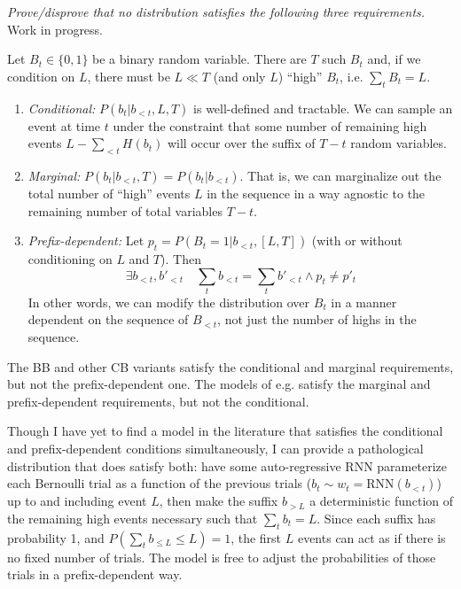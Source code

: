 \documentclass{article}
\begin{document}
\emph{Prove/disprove that no distribution satisfies the following three
requirements.}
Work in progress.

Let $B_t \in \{0,1\}$ be a binary random variable. There are $T$ such $B_t$
and, if we condition on $L$, there must be $L \ll T$ (and only $L$) ``high''
$B_t$, i.e. $\sum_t B_t = L$.
%
\begin{enumerate}
    \item \emph{Conditional:} $P(b_t|b_{<t}, L, T)$ is well-defined and
          tractable. We can sample an event at time $t$ under the constraint
          that some number of remaining high events $L - \sum_{<t} H(b_t)$ will
          occur over the suffix of $T - t$ random variables.
    \item \emph{Marginal:} $P(b_t|b_{<t}, T) = P(b_t|b_{<t})$. That is, we can
          marginalize out the total number of ``high'' events $L$ in the
          sequence in a way agnostic to the remaining number of total variables
          $T - t$.
    \item \emph{Prefix-dependent:} Let $p_t = P(B_t = 1|b_{<t}, [L, T])$
          (with or without conditioning on $L$ and $T$). Then
          \begin{equation*}
            \exists b_{<t}, b'_{<t} \quad
                \sum_t b_{<t} = \sum_t b'_{<t} \land p_t \neq p'_t
          \end{equation*}
          In other words, we can modify the distribution over $B_t$ in a manner
          dependent on the sequence of $B_{<t}$, not just the number of highs
          in the sequence.
\end{enumerate}
%
The BB and other CB variants satisfy the conditional and marginal requirements,
but not the prefix-dependent one. The models of e.g.
\citet{luoLearningOnlineAlignments2017,raffelOnlineLineartimeAttention2017}
satisfy the marginal and prefix-dependent requirements, but not the
conditional.

Though I have yet to find a model in the literature that satisfies the
conditional and prefix-dependent conditions simultaneously, I can provide a
pathological distribution that does satisfy both: have some auto-regressive RNN
parameterize each Bernoulli trial as a function of the previous trials ($b_t
\sim w_t = \text{RNN}(b_{<t})$) up to and including event $L$, then make the
suffix $b_{>L}$ a deterministic function of the remaining high events necessary
such that $\sum_t b_t = L$. Since each suffix has probability 1, and $P(\sum_t
b_{\leq L} \leq L) = 1$, the first $L$ events can act as if there is no fixed
number of trials. The model is free to adjust the probabilities of those trials
in a prefix-dependent way.
\end{document}
